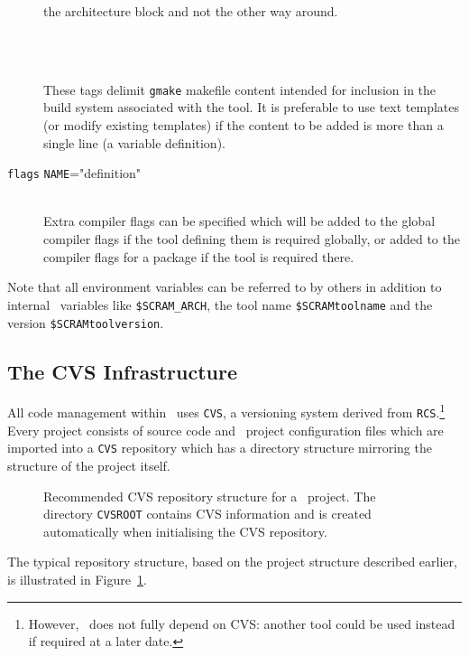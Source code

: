 \begin{description}
  the architecture block and not the other way around.
\item[\tagstart{makefile}~\tagend{makefile}]\mbox{}\\
  These tags delimit \texttt{gmake} makefile content intended for
  inclusion in the build system associated with the tool. It is preferable to use
  text templates (or modify existing templates) if the content to be
  added is more than a single line (\eg a variable definition).
\item[\lbkt\texttt{flags} \texttt{NAME}="definition"\rbkt]\mbox{}\\
  Extra compiler flags can be specified which will be added to the
  global compiler flags if the tool defining them is required
  globally, or added to the compiler flags for a package if the tool
  is required there.
\end{description}

\ni Note that all environment variables can be referred to by others in
addition to internal \scram\ variables like \texttt{\$SCRAM\_ARCH}, the
tool name \texttt{\$SCRAMtoolname} and the version
\texttt{\$SCRAMtoolversion}.

\subsection{The CVS Infrastructure}\label{sec:configuringCVSinf}
All code management within \scram\ uses \texttt{CVS}, a versioning system 
derived from \texttt{RCS}.\footnote{However, \scram\ does
not fully depend on CVS: another tool could be used instead if
required at a later date.}
Every project consists of source code and \scram\ project
configuration files which are imported into a \texttt{CVS} repository which
has a directory structure mirroring the structure of the project itself.
\begin{figure}[ht]
  \begin{center}
    \leavevmode {}
    \caption{Recommended CVS repository structure for a \scram\
      project. The directory \texttt{CVSROOT} contains CVS information
      and is created automatically when initialising the CVS repository.}
    \label{fig:recprojstructCVS}
  \end{center}
\end{figure}
The typical repository structure, based on the project structure
described earlier, is illustrated in Figure~\ref{fig:recprojstructCVS}.
%
